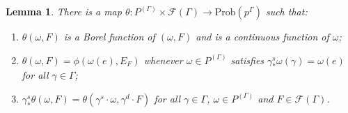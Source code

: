 \documentclass[12pt]{amsart}
\newtheorem{lem}[thm]{Lemma}
\theoremstyle{definition}
\def\cal{\mathcal}
\newcommand{\Prob}{\mathrm{Prob}}
\begin{document}
\begin{lem} \label{lem:fmap}
	There is a map $\theta : P^{(\Gamma)} \times \cal F(\Gamma) \rightarrow \Prob(p^\Gamma)$ such that:
	\begin{enumerate}
		\item[(a)] $\theta(\omega, F)$ is a Borel function of $(\omega, F)$ and is a continuous function of $\omega$;
		\item[(b)] $\theta(\omega, F) = \phi(\omega(e), E_F)$ whenever $\omega \in P^{(\Gamma)}$ satisfies $\gamma^s_* \omega(\gamma) = \omega(e)$ for all $\gamma \in \Gamma$;
		\item[(c)] $\gamma^s_* \theta(\omega, F) = \theta(\gamma^s \cdot \omega, \gamma^d \cdot F)$ for all $\gamma \in \Gamma$, $\omega \in P^{(\Gamma)}$ and $F \in \cal F(\Gamma)$.
	\end{enumerate}
\end{lem}
\end{document}
